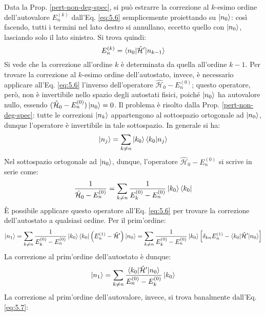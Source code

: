 Data la Prop. \ref{pert-non-deg-spec}, si può estrarre la correzione al $ k $-esimo ordine dell'autovalore $ E_n^{(k)} $ dall'Eq. \ref{eq:5.6} semplicemente proiettando su $ \ket{n_0} $: così facendo, tutti i termini nel lato destro si annullano, eccetto quello con $ \ket{n_0} $, lasciando solo il lato sinistro. Si trova quindi:
\begin{equation}
	E_n^{(k)} = \braket{n_0 | \hat{\mathcal{H}}' | n_{k-1}}
	\label{eq:5.7}
\end{equation}
Si vede che la correzione all'ordine $ k $ è determinata da quella all'ordine $ k - 1 $. Per trovare la correzione al $ k $-esimo ordine dell'autostato, invece, è necessario applicare all'Eq. \ref{eq:5.6} l'inverso dell'operatore $ \hat{\mathcal{H}}_0 - E_n^{(0)} $; questo operatore, però, non è invertibile nello spazio degli autostati fisici, poiché $ \ket{n_0} $ ha autovalore nullo, essendo $ (\hat{\mathcal{H}}_0 - E_n^{(0)}) \ket{n_0} = 0 $. Il problema è risolto dalla Prop. \ref{pert-non-deg-spec}: tutte le correzioni $ \ket{n_k} $ appartengono al sottospazio ortogonale ad $ \ket{n_0} $, dunque l'operatore è invertibile in tale sottospazio. In generale si ha:
\begin{equation}
	\ket{n_j} = \sum_{k \neq n} \ket{k_0} \braket{k_0 | n_j}
	\label{eq:5.8}
\end{equation}
Nel sottospazio ortogonale ad $ \ket{n_0} $, dunque, l'operatore $ \hat{\mathcal{H}}_0 - E_n^{(0)} $ si scrive in serie come:
\begin{equation}
	\frac{1}{\hat{\mathcal{H}}_0 - E_n^{(0)}} = \sum_{k \neq n} \frac{1}{E_k^{(0)} - E_n^{(0)}} \ket{k_0} \bra{k_0}
	\label{eq:5.9}
\end{equation}
È possibile applicare questo operatore all'Eq. \ref{eq:5.6} per trovare la correzione dell'autostato a qualsiasi ordine. Per il prim'ordine:
\begin{equation*}
	\ket{n_1} = \sum_{k \neq n} \frac{1}{E_k^{(0)} - E_n^{(0)}} \ket{k_0} \braket{k_0 | \left( E_n^{(1)} - \hat{\mathcal{H}}' \right) | n_0} = \sum_{k \neq n} \frac{1}{E_k^{(0)} - E_n^{(0)}} \ket{k_0} \left[ \delta_{kn} E_n^{(1)} - \braket{k_0 | \hat{\mathcal{H}}' | n_0} \right]
\end{equation*}
La correzione al prim'ordine dell'autostato è dunque:
\begin{equation}
	\ket{n_1} = \sum_{k \neq n} \frac{\braket{k_0 | \hat{\mathcal{H}}' | n_0}}{E_n^{(0)} - E_k^{(0)}} \ket{k_0}
	\label{eq:5.10}
\end{equation}
La correzione al prim'ordine dell'autovalore, invece, si trova banalmente dall'Eq. \ref{eq:5.7}:
